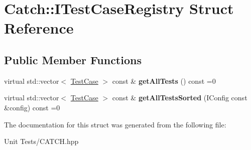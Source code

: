 \hypertarget{structCatch_1_1ITestCaseRegistry}{}\section{Catch\+:\+:I\+Test\+Case\+Registry Struct Reference}
\label{structCatch_1_1ITestCaseRegistry}
\subsection*{Public Member Functions}
\begin{DoxyCompactItemize}
\item 
virtual std\+::vector$<$ \hyperlink{classCatch_1_1TestCase}{Test\+Case} $>$ const \& {\bfseries get\+All\+Tests} () const =0\hypertarget{structCatch_1_1ITestCaseRegistry_ad6e4d4a621655123f73ae98cfeda063d}{}\label{structCatch_1_1ITestCaseRegistry_ad6e4d4a621655123f73ae98cfeda063d}

\item 
virtual std\+::vector$<$ \hyperlink{classCatch_1_1TestCase}{Test\+Case} $>$ const \& {\bfseries get\+All\+Tests\+Sorted} (I\+Config const \&config) const =0\hypertarget{structCatch_1_1ITestCaseRegistry_a33e46639d0319d35497c05bb5d02be5a}{}\label{structCatch_1_1ITestCaseRegistry_a33e46639d0319d35497c05bb5d02be5a}

\end{DoxyCompactItemize}


The documentation for this struct was generated from the following file\+:\begin{DoxyCompactItemize}
\item 
Unit Tests/C\+A\+T\+C\+H.\+hpp\end{DoxyCompactItemize}
